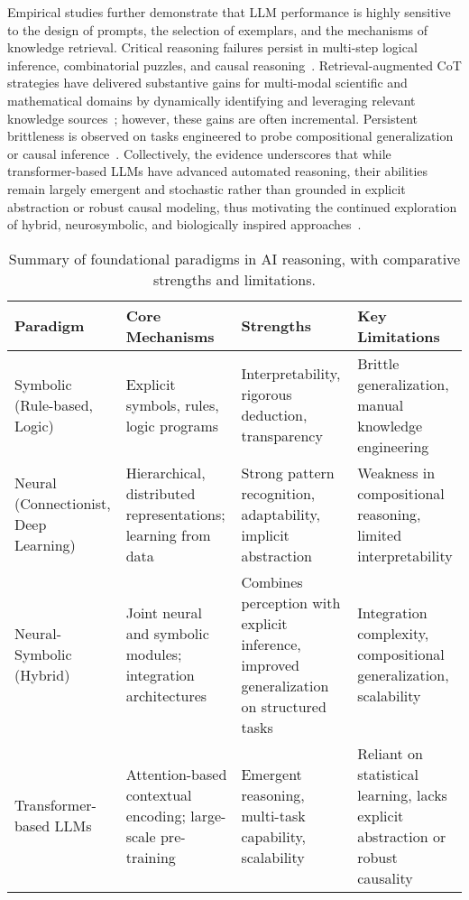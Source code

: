 \documentclass[sigconf]{acmart}
\begin{document}
Empirical studies further demonstrate that LLM performance is highly sensitive to the design of prompts, the selection of exemplars, and the mechanisms of knowledge retrieval. Critical reasoning failures persist in multi-step logical inference, combinatorial puzzles, and causal reasoning~\cite{ref1,ref10,ref19}. Retrieval-augmented CoT strategies have delivered substantive gains for multi-modal scientific and mathematical domains by dynamically identifying and leveraging relevant knowledge sources~\cite{ref11,ref42}; however, these gains are often incremental. Persistent brittleness is observed on tasks engineered to probe compositional generalization or causal inference~\cite{ref43,ref44,ref70,ref86}. Collectively, the evidence underscores that while transformer-based LLMs have advanced automated reasoning, their abilities remain largely emergent and stochastic rather than grounded in explicit abstraction or robust causal modeling, thus motivating the continued exploration of hybrid, neurosymbolic, and biologically inspired approaches~\cite{ref42,ref49,ref86}.

\begin{table*}[htbp]
\centering
\caption{Summary of foundational paradigms in AI reasoning, with comparative strengths and limitations.}
\label{tab:paradigm_comparison}
\begin{adjustbox}{max width=\textwidth}
\begin{tabular}{llll}
\toprule
\textbf{Paradigm} & \textbf{Core Mechanisms} & \textbf{Strengths} & \textbf{Key Limitations} \\
\midrule
Symbolic (Rule-based, Logic) & Explicit symbols, rules, logic programs & Interpretability, rigorous deduction, transparency & Brittle generalization, manual knowledge engineering \\
Neural (Connectionist, Deep Learning) & Hierarchical, distributed representations; learning from data & Strong pattern recognition, adaptability, implicit abstraction & Weakness in compositional reasoning, limited interpretability \\
Neural-Symbolic (Hybrid) & Joint neural and symbolic modules; integration architectures & Combines perception with explicit inference, improved generalization on structured tasks & Integration complexity, compositional generalization, scalability \\
Transformer-based LLMs & Attention-based contextual encoding; large-scale pre-training & Emergent reasoning, multi-task capability, scalability & Reliant on statistical learning, lacks explicit abstraction or robust causality \\
\bottomrule
\end{tabular}
\end{adjustbox}
\end{table*}
\end{document}
